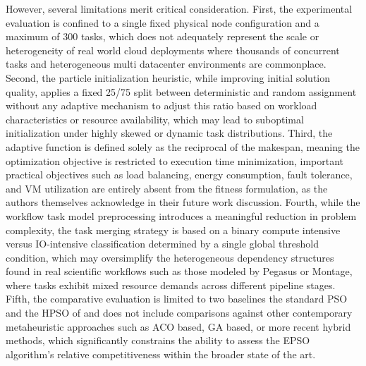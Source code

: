 \documentclass[pdflatex,sn-mathphys-num]{sn-jnl}%
\theoremstyle{thmstyleone}%
\theoremstyle{thmstyletwo}%
\theoremstyle{thmstylethree}%
\begin{document}
However, several limitations merit critical consideration. First, the experimental evaluation is confined to a single fixed physical node configuration and a maximum of 300 tasks, which does not adequately represent the scale or heterogeneity of real world cloud deployments where thousands of concurrent tasks and heterogeneous multi datacenter environments are commonplace. Second, the particle initialization heuristic, while improving initial solution quality, applies a fixed 25/75 split between deterministic and random assignment without any adaptive mechanism to adjust this ratio based on workload characteristics or resource availability, which may lead to suboptimal initialization under highly skewed or dynamic task distributions. Third, the adaptive function is defined solely as the reciprocal of the makespan, meaning the optimization objective is restricted to execution time minimization, important practical objectives such as load balancing, energy consumption, fault tolerance, and VM utilization are entirely absent from the fitness formulation, as the authors themselves acknowledge in their future work discussion. Fourth, while the workflow task model preprocessing introduces a meaningful reduction in problem complexity, the task merging strategy is based on a binary compute intensive versus IO-intensive classification determined by a single global threshold condition, which may oversimplify the heterogeneous dependency structures found in real scientific workflows such as those modeled by Pegasus or Montage, where tasks exhibit mixed resource demands across different pipeline stages. Fifth, the comparative evaluation is limited to two baselines  the standard PSO and the HPSO of and does not include comparisons against other contemporary metaheuristic approaches such as ACO based, GA based, or more recent hybrid methods, which significantly constrains the ability to assess the EPSO algorithm's relative competitiveness within the broader state of the art.
\end{document}
